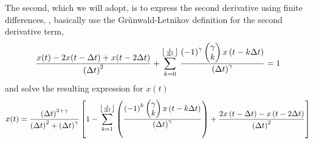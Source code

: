 \begin{example}
  The second, which we will adopt, is to express the second derivative using finite differences, \ie, basically use the Gr\"unwald-Letnikov definition for the second derivative term, 
  \begin{equation*}
    \frac{x(t) - 2 x(t - \Delta t) + x(t - 2 \Delta t)}{\left( \Delta t \right)^2} + \sum_{k=0}^{\left\lfloor \frac{t}{\Delta t} \right\rfloor} \frac{\left( -1 \right)^\gamma \begin{pmatrix}\gamma \\ k \end{pmatrix} x \left( t - k \Delta t \right)}{\left( \Delta t \right)^\gamma} = 1 
  \end{equation*}
and solve the resulting expression for $x(t)$
\begin{equation*}
  x(t) = \frac{\left( \Delta t \right)^{2 + \gamma}}{\left( \Delta t \right)^2 + \left( \Delta t \right)^\gamma} \left[
    1 - \sum_{k=1}^{\left\lfloor \frac{t}{\Delta t} \right\rfloor} \left( \frac{\left( -1 \right)^k \begin{pmatrix} \gamma \\ k \end{pmatrix} x \left( t - k \Delta t \right)}{\left( \Delta t \right)^\gamma} \right) + \frac{2 x \left( t - \Delta t \right) - x \left( t - 2 \Delta t \right)}{\left( \Delta t \right)^2}
  \right]
\end{equation*}
\end{example}
